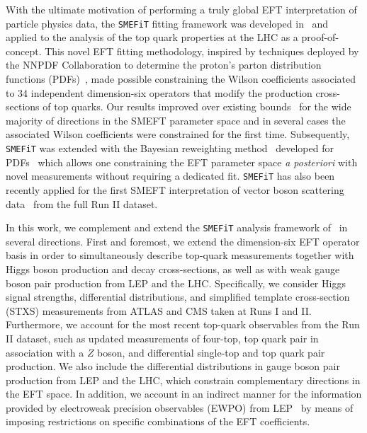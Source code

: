 With the ultimate motivation of performing a truly global EFT interpretation
of particle physics data, the {\tt SMEFiT} fitting framework was developed in~\cite{Hartland:2019bjb}
and applied to the analysis of the top quark properties at the LHC as a proof-of-concept.
%
This novel EFT fitting methodology, inspired by techniques deployed by the NNPDF
Collaboration to
determine the proton's parton distribution
functions (PDFs)~\cite{Ball:2008by,Ball:2010de,Ball:2014uwa,Rojo:2018qdd,Forte:2020yip},
made possible constraining the Wilson coefficients
associated to 34 independent dimension-six
operators that modify the production cross-sections of top
quarks.
%
Our results improved over
existing bounds~\cite{AguilarSaavedra:2018nen} for the wide majority of
directions in the SMEFT parameter space and in several
cases the associated Wilson coefficients were constrained for the first time.
%
Subsequently, {\tt SMEFiT} was extended with the Bayesian reweighting method~\cite{vanBeek:2019evb}
developed for PDFs~\cite{Ball:2011gg,Ball:2010gb} which  allows one
constraining the EFT parameter space {\it a posteriori}
with novel measurements without requiring a dedicated fit.
%
 {\tt SMEFiT} has also been recently applied for the first SMEFT interpretation of vector boson
 scattering data~\cite{Ethier:2021ydt} from the full Run II dataset.

In this work, we complement and
extend the {\tt SMEFiT} analysis framework of~\cite{Hartland:2019bjb} in several directions.
%
First and foremost, we extend the dimension-six EFT operator basis
in order to simultaneously describe top-quark
measurements together with Higgs boson production and decay cross-sections,
as well as with weak gauge boson pair production from LEP and the LHC.
%
Specifically, we consider Higgs signal strengths, differential distributions,
and simplified template cross-section (STXS) measurements from 
ATLAS and CMS taken at Runs I and II.
%
Furthermore, we account for the most recent top-quark observables
from the Run II dataset, such as updated measurements of four-top,
top quark pair in association with a $Z$ boson, and differential
single-top and top quark pair production.
%
We also include the differential distributions
in gauge boson pair production from LEP
and the LHC, which constrain complementary directions in the EFT space.
In addition, we account in an indirect manner for the information
provided by electroweak precision observables (EWPO) from
LEP~\cite{ALEPH:2005ab}
by means of imposing restrictions on specific combinations
of the EFT coefficients.

